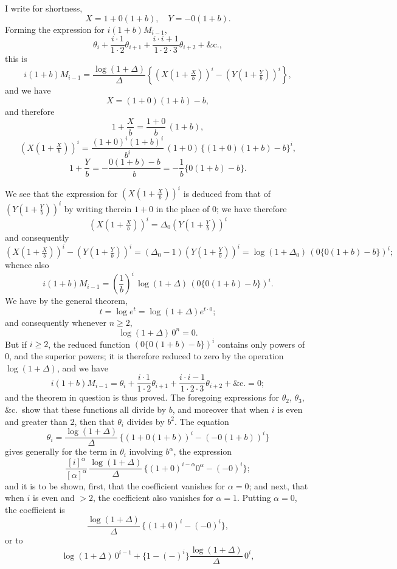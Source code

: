 \documentclass[11pt,a4paper]{article}
\begin{document}
I write for shortness,
\[
X = 1 + 0(1 + b),\quad Y = -0(1 + b).
\]
Forming the expression for $i(1+b) M_{i-1}$,
\[
\theta_{i} + \frac{i \cdot 1}{1 \cdot 2}\theta_{i+1} + \frac{i \cdot i+1}{1 \cdot 2 \cdot 3}\theta_{i+2} + \&\mathrm{c.},
\]
this is
\[
i(1+b)M_{i-1} = \frac{\log(1+\Delta)}{\Delta}\left\{\left(X\!\left(1+\tfrac{X}{b}\right)\right)^{i} - \left(Y\!\left(1+\tfrac{Y}{b}\right)\right)^{i}\right\},
\]
and we have
\[
X = (1 + 0)(1 + b) - b,
\]
and therefore
\[
1 + \frac{X}{b} = \frac{1+0}{b}\,(1+b),
\]
\[
\left(X\left(1+\tfrac{X}{b}\right)\right)^{i} = \frac{(1+0)^{i}(1+b)^{i}}{b^{i}}\,(1+0)\,\{(1+0)(1+b) - b\}^{i},
\]
\[
1 + \frac{Y}{b} = -\frac{0(1+b)-b}{b} = -\frac{1}{b}\{0(1+b) - b\}.
\]

\setcounter{page}{97}

We see that the expression for $\left(X\left(1+\tfrac{X}{b}\right)\right)^{i}$ is deduced from that of $\left(Y\left(1+\tfrac{Y}{b}\right)\right)^{i}$ by writing therein $1 + 0$ in the place of $0$; we have therefore
\[
\left(X\left(1+\tfrac{X}{b}\right)\right)^{i} = \Delta_{0}\left(Y\left(1+\tfrac{Y}{b}\right)\right)^{i}
\]
and consequently
\[
\left(X\left(1+\tfrac{X}{b}\right)\right)^{i} - \left(Y\left(1+\tfrac{Y}{b}\right)\right)^{i} = (\Delta_{0} - 1)\left(Y\left(1+\tfrac{Y}{b}\right)\right)^{i} = \log(1+\Delta_{0})\, (0\{0(1+b)-b\})^{i};
\]
whence also
\[
i(1+b) M_{i-1} = \left(\frac{1}{b}\right)^{i}\,\log(1+\Delta)\,(0\{0(1+b) - b\})^{i}.
\]
We have by the general theorem,
\[
t = \log e^{t} = \log(1 + \Delta) e^{t \cdot 0};
\]
and consequently whenever $n \geq 2$,
\[
\log(1 + \Delta)\, 0^{n} = 0.
\]
But if $i \geq 2$, the reduced function $(0\{0(1+b) - b\})^{i}$ contains only powers of $0$, and the superior powers; it is therefore reduced to zero by the operation $\log(1+\Delta)$, and we have
\[
i(1+b) M_{i-1} = \theta_{i} + \frac{i \cdot 1}{1 \cdot 2}\theta_{i+1} + \frac{i \cdot i-1}{1 \cdot 2 \cdot 3}\theta_{i+2} + \&\mathrm{c.} = 0;
\]
and the theorem in question is thus proved. The foregoing expressions for $\theta_{2}$, $\theta_{3}$, \&c.\ show that these functions all divide by $b$, and moreover that when $i$ is even and greater than 2, then that $\theta_{i}$ divides by $b^{2}$. The equation
\[
\theta_{i} = \frac{\log(1 + \Delta)}{\Delta}\,\{(1 + 0(1+b))^{i} - (-0(1+b))^{i}\}
\]
gives generally for the term in $\theta_{i}$ involving $b^{\alpha}$, the expression
\[
\frac{[i]^{\alpha}}{[\alpha]^{\alpha}}\,\frac{\log(1+\Delta)}{\Delta}\,\{(1+0)^{i-\alpha} 0^{\alpha} - (-0)^{i}\};
\]
and it is to be shown, first, that the coefficient vanishes for $\alpha = 0$; and next, that when $i$ is even and $> 2$, the coefficient also vanishes for $\alpha = 1$. Putting $\alpha = 0$, the coefficient is
\[
\frac{\log(1+\Delta)}{\Delta}\,\{(1+0)^{i} - (-0)^{i}\},
\]
or to
\[
\log(1+\Delta)\, 0^{i-1} + \{1 - (-)^{i}\}\frac{\log(1+\Delta)}{\Delta}\, 0^{i},
\]
\end{document}
